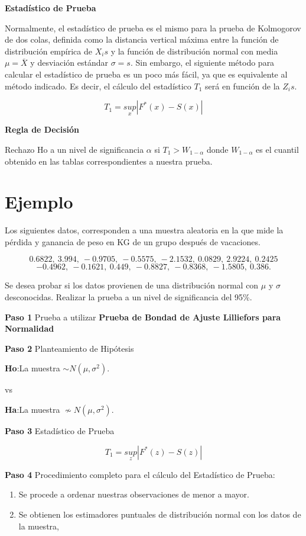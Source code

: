 \documentclass[a4paper,oneside,openany]{book}
\begin{document}
\textbf{Estadístico de Prueba}

Normalmente, el estadístico de prueba es el mismo para la prueba de
Kolmogorov de dos colas, definida como la distancia vertical máxima
entre la función de distribución empírica de \(X_{i}s\) y la función de
distribución normal con media \(\mu=\overline{X}\) y desviación estándar
\(\sigma=s\). Sin embargo, el siguiente método para calcular el
estadístico de prueba es un poco más fácil, ya que es equivalente al
método indicado. Es decir, el cálculo del estadístico \(T_{1}\) será en
función de la \(Z_{i}s\).

\[T_{1}=\underset{x}{sup}|F^*(x)-S(x)|\]

\textbf{Regla de Decisión}

Rechazo Ho a un nivel de significancia \(\alpha\) si
\(T_{1}> W_{1-\alpha}\) donde \(W_{1-\alpha}\) es el cuantil obtenido en
las tablas correspondientes a nuestra prueba.

\section{Ejemplo}\label{ejemplo-13}

Los siguientes datos, corresponden a una muestra aleatoria en la que
mide la pérdida y ganancia de peso en KG de un grupo después de
vacaciones.

\[0.6822,\ 3.994,\ -0.9705,\ -0.5575,\ -2.1532,\ 0.0829,\ 2.9224,\ 0.2425\]
\[-0.4962,\ -0.1621,\ 0.449,\ -0.8827,\ -0.8368,\ -1.5805,\ 0.386.\]

Se desea probar si los datos provienen de una distribución normal con
\(\mu\) y \(\sigma\) desconocidas. Realizar la prueba a un nivel de
significancia del 95\%.

\textbf{Paso 1} Prueba a utilizar \textbf{Prueba de Bondad de Ajuste
Lilliefors para Normalidad}

\textbf{Paso 2} Planteamiento de Hipótesis

\textbf{Ho}:La muestra \(\sim N(\mu,\sigma^2)\).

vs

\textbf{Ha}:La muestra \(\nsim N(\mu,\sigma^2)\).

\textbf{Paso 3} Estadístico de Prueba

\[T_{1}=\underset{z}{sup}|F^*(z)-S(z)|\]

\textbf{Paso 4} Procedimiento completo para el cálculo del Estadístico
de Prueba:

\begin{enumerate}
\def\labelenumi{\arabic{enumi})}
\item
  Se procede a ordenar nuestras observaciones de menor a mayor.
\item
  Se obtienen los estimadores puntuales de distribución normal con los
  datos de la muestra,
\end{enumerate}
\end{document}
